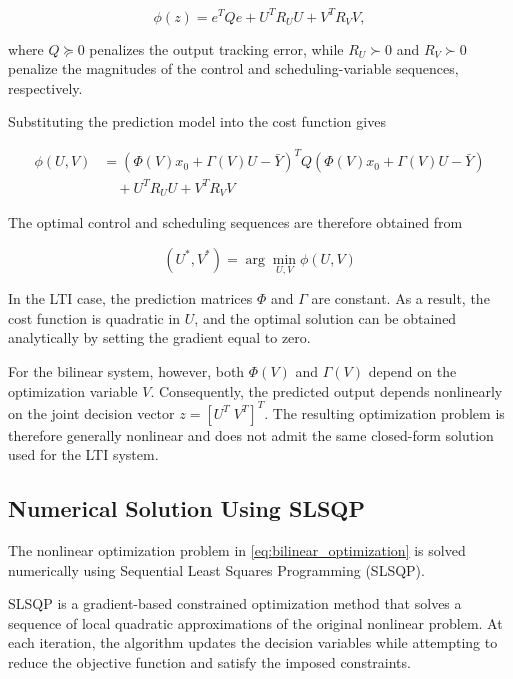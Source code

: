 \begin{equation}
    \phi(z)
    =
    e^TQe
    +
    U^TR_UU
    +
    V^TR_VV,
    \label{eq:bilinear_cost_compact}
\end{equation}

where \(Q \succeq 0\) penalizes the output tracking error, while
\(R_U \succ 0\) and \(R_V \succ 0\) penalize the magnitudes of the control and scheduling-variable sequences, respectively.

Substituting the prediction model into the cost function gives

\begin{align}
    \phi(U,V)
    &=
    \left(
        \Phi(V)x_0
        +
        \Gamma(V)U
        -
        \bar{Y}
    \right)^T
    Q
    \left(
        \Phi(V)x_0
        +
        \Gamma(V)U
        -
        \bar{Y}
    \right)
    \nonumber\\
    &\quad
    +
    U^TR_UU
    +
    V^TR_VV
    \label{eq:bilinear_cost_expanded}
\end{align}

The optimal control and scheduling sequences are therefore obtained from

\begin{equation}
    \boxed{
    (U^\ast,V^\ast)
    =
    \arg\min_{U,V}
    \phi(U,V)
    }
    \label{eq:bilinear_optimization}
\end{equation}

In the LTI case, the prediction matrices \(\Phi\) and \(\Gamma\) are constant. As a result, the cost function is quadratic in \(U\), and the optimal solution can be obtained analytically by setting the gradient equal to zero.

For the bilinear system, however, both \(\Phi(V)\) and \(\Gamma(V)\) depend on the optimization variable \(V\). Consequently, the predicted output depends nonlinearly on the joint decision vector \(z=[U^T \; V^T]^T\). The resulting optimization problem is therefore generally nonlinear and does not admit the same closed-form solution used for the LTI system.

\subsection{Numerical Solution Using SLSQP}

The nonlinear optimization problem in \cref{eq:bilinear_optimization} is solved numerically using Sequential Least Squares Programming (SLSQP).

SLSQP is a gradient-based constrained optimization method that solves a sequence of local quadratic approximations of the original nonlinear problem. At each iteration, the algorithm updates the decision variables while attempting to reduce the objective function and satisfy the imposed constraints.

